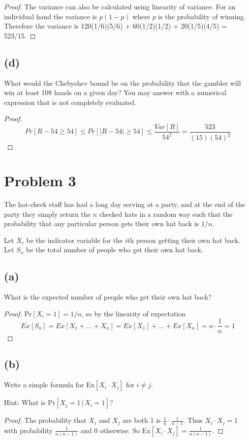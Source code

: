 \documentclass[14pt]{extarticle}
\begin{document}
\begin{proof}
The variance can also be calculated using linearity of variance. For an individual hand the variance is $p(1 - p)$ where $p$ is the probability of winning. Therefore the variance is 120(1/6)(5/6) + 60(1/2)(1/2) + 20(1/5)(4/5) = 523/15.
\end{proof}

\subsection{(d)}
What would the Chebyshev bound be on the probability that the gambler will win at least 108 hands on a given day? You may answer with a numerical expression that is not completely evaluated.

\begin{proof}
$$
Pr[R - 54 \geq 54] \leq Pr[|R - 54| \geq 54] \leq \frac{Var[R]}{54^2} = \frac{523}{(15)(54)^2}
$$
\end{proof}

\section{Problem 3}
The hat-check staff has had a long day serving at a party, and at the end of the party they simply return the $n$ checked hats in a random way such that the probability that any particular person gets their own hat back is $1/n$.

Let $X_i$ be the indicator variable for the $i$th person getting their own hat back. Let $S_n$ be the total number of people who get their own hat back.

\subsection{(a)}
What is the expected number of people who get their own hat back?
\begin{proof}
Pr$[X_i = 1] = 1/n$, so by the linearity of expectation 
$$
Ex[S_n] = Ex[X_1 + \ldots + X_n] = Ex[X_1] + \ldots + Ex[X_n] = n \cdot \frac{1}{n} = 1
$$
\end{proof}

\subsection{(b)}
Write a simple formula for Ex$[X_i \cdot X_j]$ for $i \neq j$.

Hint: What is Pr$[X_j = 1 \,|\, X_i = 1]$?

\begin{proof}
The probability that $X_i$ and $X_j$ are both 1 is $\frac{1}{n} \cdot\frac{1}{n-1}$. Thus $X_i \cdot X_j = 1$ with probability $\frac{1}{n(n-1)}$ and 0 otherwise. So Ex$[X_i \cdot X_j] = \frac{1}{n(n-1)}$.
\end{proof}
\end{document}
